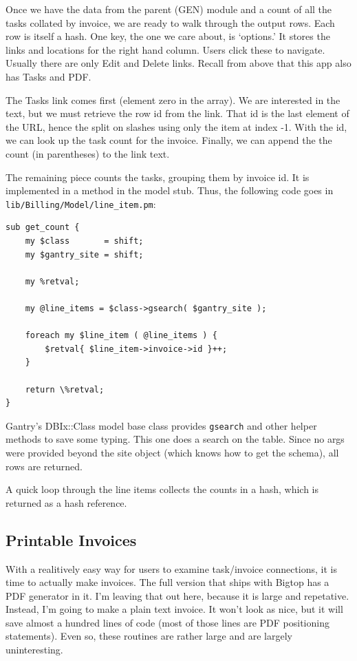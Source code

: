Once we have the data from the parent (GEN) module and a count of all the
tasks collated by invoice, we are ready to walk through the output rows.
Each row is itself a hash.  One key, the one we care about, is `options.'
It stores the links and locations for the right hand column.  Users click
these to navigate.  Usually there are only Edit and Delete links.  Recall
from above that this app also has Tasks and PDF.

The Tasks link comes first (element zero in the array).  We are interested
in the text, but we must retrieve the row id from the link.  That id is
the last element of the URL, hence the split on slashes using only the item
at index -1.  With the id, we can look up the task count for the invoice.
Finally, we can append the the count (in parentheses) to the link text.

The remaining piece counts the tasks, grouping them by invoice id.  It is
implemented in a method in the model stub.  Thus, the following code goes
in \verb+lib/Billing/Model/line_item.pm+:

\begin{verbatim}
sub get_count {
    my $class       = shift;
    my $gantry_site = shift;

    my %retval;

    my @line_items = $class->gsearch( $gantry_site );

    foreach my $line_item ( @line_items ) {
        $retval{ $line_item->invoice->id }++;
    }

    return \%retval;
}
\end{verbatim}

Gantry's DBIx::Class model base class provides \verb+gsearch+ and other
helper methods to save some typing.  This one does a search on the table.
Since no args were provided beyond the site object (which knows how to
get the schema), all rows are returned.

A quick loop through the line items collects the counts in a hash, which
is returned as a hash reference.

\subsection*{Printable Invoices}

With a realitively easy way for users to examine task/invoice connections,
it is time to actually make invoices.  The full version that ships with
Bigtop has a PDF generator in it.  I'm leaving that out here, because it
is large and repetative.  Instead, I'm going to make a plain text invoice.
It won't look as nice, but it will save almost a hundred lines of code
(most of those lines are PDF positioning statements).  Even so, these routines
are rather large and are largely uninteresting.

